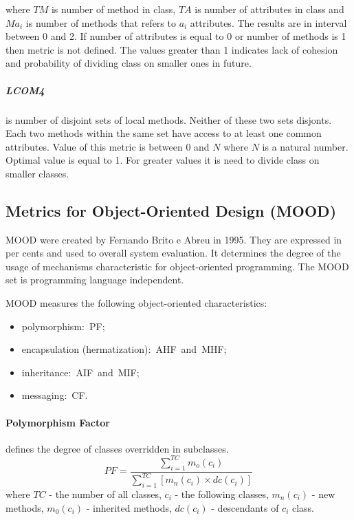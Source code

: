 where $TM$ is number of method in class, $TA$ is number of attributes in class and $Ma_{i}$ is number of methods that refers to $a_{i}$ attributes. The results are in interval between 0 and 2. If number of attributes is equal to 0 or number of methods is 1 then metric is not defined. The values greater than 1 indicates lack of cohesion and probability of dividing class on smaller ones in future. 

\subparagraph*{LCOM4} is number of disjoint sets of local methods. Neither of these two sets disjonts. Each two methods within the same set have access to at least one common attributes. Value of this metric is between 0 and $N$ where $N$ is a natural number. Optimal value is equal to 1. For greater values it is need to divide class on smaller classes. 

\subsection{Metrics for Object-Oriented Design (MOOD)}
\ac{MOOD} were created by Fernando Brito e Abreu in 1995. They are expressed in per cents and used to overall system evaluation. It determines the degree of the usage of mechanisms characteristic for object-oriented programming. The \ac{MOOD} set is programming language independent. 

\ac{MOOD} measures the following object-oriented characteristics:

\begin{itemize}\addtolength{\itemsep}{-0.5\baselineskip}\vspace{-7mm}
\item  polymorphism:~\ac{PF};
\item encapsulation (hermatization):~\ac{AHF}~and~\ac{MHF};
\item inheritance:~\ac{AIF}~and~\ac{MIF};
\item messaging:~\ac{CF}.
\end{itemize}\vspace{-10mm}

\paragraph{Polymorphism Factor} defines the degree of classes overridden in subclasses.
\begin{equation}
PF=\frac { \sum _{ i=1 }^{ TC }{ { m }_{ o }({ c }_{ i }) }  }{ \sum _{ i=1 }^{ TC }{ \left[ { m }_{ n }({ c }_{ i })\times dc({ c }_{ i }) \right]  }  } 
\end{equation}
where $TC$ - the number of all classes, $c_{i}$ - the following classes, $m_{n}(c_{i})$ - new methods, $m_{0}(c_{i})$ - inherited methods, $dc(c_{i})$ - descendants of $c_{i}$ class. 


